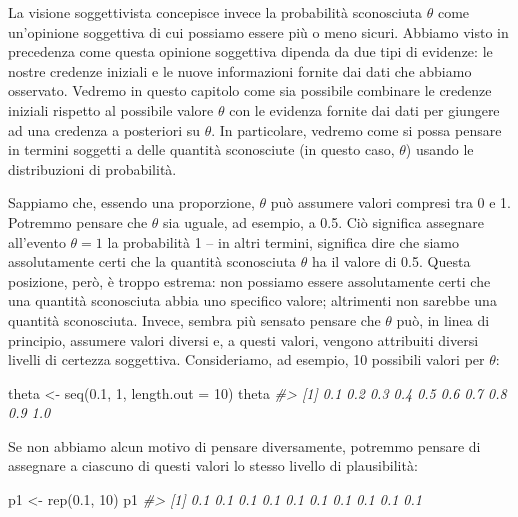 \documentclass[
  11pt,
]{krantz}
\makeatletter
\newenvironment{Shaded}{\begin{snugshade}}{\end{snugshade}}
\newcommand{\AttributeTok}[1]{\textcolor[rgb]{0.61,0.61,0.61}{#1}}
\newcommand{\CommentTok}[1]{\textcolor[rgb]{0.37,0.37,0.37}{\textit{#1}}}
\newcommand{\DecValTok}[1]{\textcolor[rgb]{0.06,0.06,0.06}{#1}}
\newcommand{\FloatTok}[1]{\textcolor[rgb]{0.06,0.06,0.06}{#1}}
\newcommand{\FunctionTok}[1]{\textcolor[rgb]{0,0,0}{#1}}
\newcommand{\NormalTok}[1]{#1}
\newcommand{\OtherTok}[1]{\textcolor[rgb]{0.37,0.37,0.37}{#1}}
\newenvironment{kframe}{%
\medskip{}
\setlength{\fboxsep}{.8em}
 \def\at@end@of@kframe{}%
 \ifinner\ifhmode%
  \def\at@end@of@kframe{\end{minipage}}%
  \begin{minipage}{\columnwidth}%
 \fi\fi%
 \def\FrameCommand##1{\hskip\@totalleftmargin \hskip-\fboxsep
 \colorbox{shadecolor}{##1}\hskip-\fboxsep
     \hskip-\linewidth \hskip-\@totalleftmargin \hskip\columnwidth}%
 \MakeFramed {\advance\hsize-\width
   \@totalleftmargin\z@ \linewidth\hsize
   \@setminipage}}%
 {\par\unskip\endMakeFramed%
 \at@end@of@kframe}
\renewenvironment{Shaded}{\begin{kframe}}{\end{kframe}}
\theoremstyle{definition}
\theoremstyle{definition}
\theoremstyle{definition}
\theoremstyle{definition}
\theoremstyle{remark}
\makeatother
\begin{document}
La visione soggettivista concepisce invece la probabilità sconosciuta \(\theta\) come un'opinione soggettiva di cui possiamo essere più o meno sicuri. Abbiamo visto in precedenza come questa opinione soggettiva dipenda da due tipi di evidenze: le nostre credenze iniziali e le nuove informazioni fornite dai dati che abbiamo osservato. Vedremo in questo capitolo come sia possibile combinare le credenze iniziali rispetto al possibile valore \(\theta\) con le evidenza fornite dai dati per giungere ad una credenza a posteriori su \(\theta\). In particolare, vedremo come si possa pensare in termini soggetti a delle quantità sconosciute (in questo caso, \(\theta\)) usando le distribuzioni di probabilità.

Sappiamo che, essendo una proporzione, \(\theta\) può assumere valori compresi tra 0 e 1. Potremmo pensare che \(\theta\) sia uguale, ad esempio, a 0.5. Ciò significa assegnare all'evento \(\theta = 1\) la probabilità 1 -- in altri termini, significa dire che siamo assolutamente certi che la quantità sconosciuta \(\theta\) ha il valore di 0.5. Questa posizione, però, è troppo estrema: non possiamo essere assolutamente certi che una quantità sconosciuta abbia uno specifico valore; altrimenti non sarebbe una quantità sconosciuta. Invece, sembra più sensato pensare che \(\theta\) può, in linea di principio, assumere valori diversi e, a questi valori, vengono attribuiti diversi livelli di certezza soggettiva. Consideriamo, ad esempio, 10 possibili valori per \(\theta\):

\begin{Shaded}
\begin{Highlighting}[]
\NormalTok{theta }\OtherTok{\textless{}{-}} \FunctionTok{seq}\NormalTok{(}\FloatTok{0.1}\NormalTok{, }\DecValTok{1}\NormalTok{, }\AttributeTok{length.out =} \DecValTok{10}\NormalTok{)}
\NormalTok{theta}
\CommentTok{\#\textgreater{}  [1] 0.1 0.2 0.3 0.4 0.5 0.6 0.7 0.8 0.9 1.0}
\end{Highlighting}
\end{Shaded}

Se non abbiamo alcun motivo di pensare diversamente, potremmo pensare di assegnare a ciascuno di questi valori lo stesso livello di plausibilità:

\begin{Shaded}
\begin{Highlighting}[]
\NormalTok{p1 }\OtherTok{\textless{}{-}} \FunctionTok{rep}\NormalTok{(}\FloatTok{0.1}\NormalTok{, }\DecValTok{10}\NormalTok{)}
\NormalTok{p1}
\CommentTok{\#\textgreater{}  [1] 0.1 0.1 0.1 0.1 0.1 0.1 0.1 0.1 0.1 0.1}
\end{Highlighting}
\end{Shaded}
\end{document}
